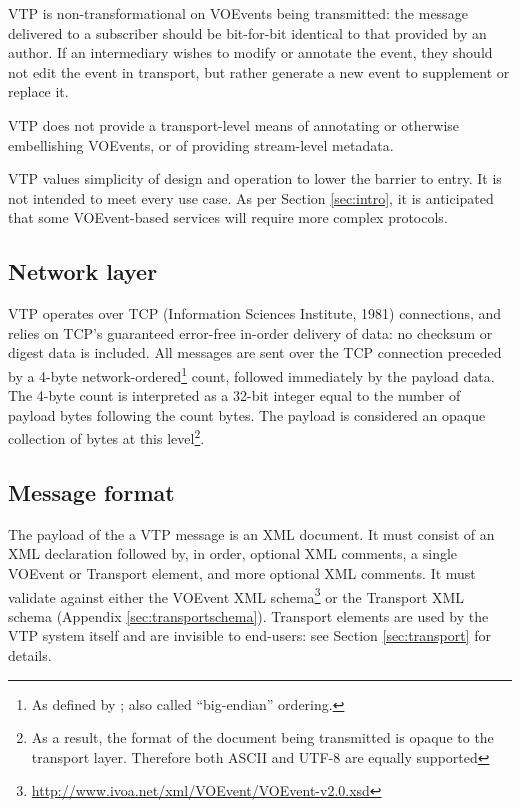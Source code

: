 \documentclass[a4paper,11pt]{ivoa}
\begin{document}
VTP is non-transformational on VOEvents being transmitted: the message
delivered to a subscriber should be bit-for-bit identical to that provided by
an author. If an intermediary wishes to modify or annotate the event, they
should not edit the event in transport, but rather generate a new event to
supplement or replace it.

VTP does not provide a transport-level means of annotating or otherwise
embellishing VOEvents, or of providing stream-level metadata.

VTP values simplicity of design and operation to lower the barrier to entry. It
is not intended to meet every use case. As per Section \ref{sec:intro}, it is
anticipated that some VOEvent-based services will require more complex
protocols.

\subsection{Network layer}

VTP operates over TCP (Information Sciences Institute, 1981) connections, and
relies on TCP's guaranteed error-free in-order delivery of data: no checksum
or digest data is included. All messages are sent over the TCP connection
preceded by a 4-byte network-ordered\footnote{As defined by
\citet{Reynolds:1994}; also called ``big-endian'' ordering.} count, followed
immediately by the payload data. The 4-byte count is interpreted as a 32-bit
integer equal to the number of payload bytes following the count bytes. The
payload is considered an opaque collection of bytes at this level\footnote{As
a result, the format of the document being transmitted is opaque to the
transport layer. Therefore both ASCII and UTF-8 are equally supported}.

\subsection{Message format}
\label{sec:common:format}

The payload of the a VTP message is an XML document. It must consist of an XML
declaration followed by, in order, optional XML comments, a single VOEvent or
Transport element, and more optional XML comments. It must validate against
either the VOEvent XML
schema\footnote{\url{http://www.ivoa.net/xml/VOEvent/VOEvent-v2.0.xsd}} or the
Transport XML schema (Appendix \ref{sec:transportschema}). Transport elements
are used by the VTP system itself and are invisible to end-users: see Section
\ref{sec:transport} for details.
\end{document}
